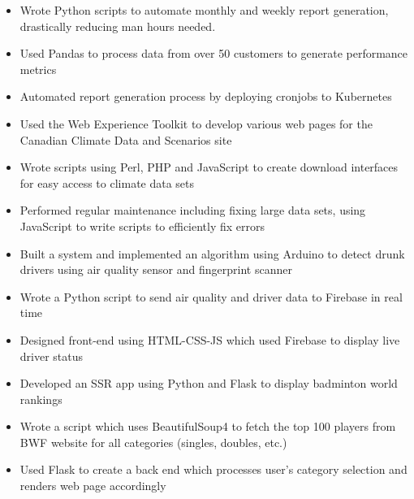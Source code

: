 \documentclass[10pt,a4paper,ragged2e,withhyper]{altacv}
\begin{document}
\begin{paracol}{2}

\begin{itemize}
\item Wrote Python scripts to automate monthly and weekly report generation, drastically reducing man hours needed. 
\item Used Pandas to process data from over 50 customers to generate performance metrics
\item Automated report generation process by deploying cronjobs to Kubernetes
\end{itemize}

\divider

\begin{itemize}
\item Used the Web Experience Toolkit to develop various web pages for the Canadian Climate Data and Scenarios site
\item Wrote scripts using Perl, PHP and JavaScript to create download interfaces for easy access to climate data sets  
\item Performed regular maintenance including fixing large data sets, using JavaScript to write scripts to efficiently fix errors
\end{itemize}


\begin{itemize}
\item Built a system and implemented an algorithm using Arduino to detect drunk drivers using air quality sensor and fingerprint scanner
\item Wrote a Python script to send air quality and driver data to Firebase in real time 
\item Designed front-end using HTML-CSS-JS which used Firebase to display live driver status
\end{itemize}

\divider

\begin{itemize}
    \item Developed an SSR app using Python and Flask to display badminton world rankings
    \item Wrote a script which uses BeautifulSoup4 to fetch the top 100 players from BWF website for all categories (singles, doubles, etc.)
    \item Used Flask to create a back end which processes user's category selection and renders web page accordingly
\end{itemize}


\end{paracol}
\end{document}
